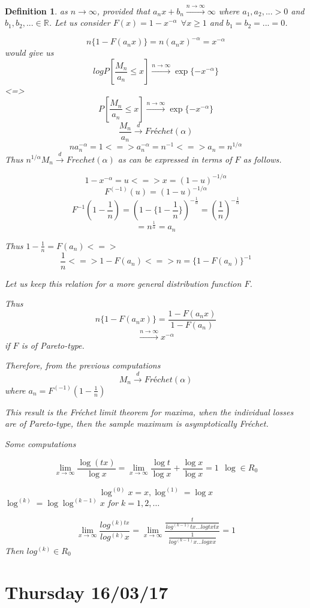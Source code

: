 \documentclass[11pt,a4paper,oneside]{article}\usepackage[]{graphicx}\usepackage[]{color}
\newenvironment{knitrout}{}{} %
\newtheorem{defi}[subsection]{Definition}
\begin{document}
\begin{algin*}
\begin{defi}
\begin{knitrout}
{}



\end{knitrout}

as $n\rightarrow \infty$, provided that $a_nx+b_n\xrightarrow{n\rightarrow\infty}\infty$ where
$a_1,a_2,...>0$ and $b_1,b_2,...\in\mathbb{R}$. Let us consider $F(x)=1-x^{-\alpha}\ \ \forall x \geq 1$ and $b_1=b_2=...=0$.

$$n\{1-F(a_nx)\}=n(a_nx)^{-\alpha}=x^{-\alpha}$$
would give us 
$$log P[\frac{M_n}{a_n}\leq x]\xrightarrow{n\rightarrow\infty}\exp\{-x^{-\alpha}\}$$
<=>
$$P[\frac{M_n}{a_n}\leq x]\xrightarrow{n\rightarrow\infty}\exp\{-x^{-\alpha}\}$$
$$\frac{M_n}{a_n}\xrightarrow{d} Fréchet(\alpha)$$
$$na_n^{-\alpha}=1<=>a_n^{-\alpha}=n^{-1}<=>a_n=n^{1/\alpha}$$
Thus $n^{1/\alpha}M_n\xrightarrow{d}Frechet(\alpha)$ as  can be expressed in terms of $F$ as follows.

$$1-x^{-\alpha}=u<=>x=(1-u)^{-1/\alpha}$$
$$F^{(-1)}(u)=(1-u)^{-1/\alpha}$$
$$F^{-1}(1-\frac{1}{n})=(1-\{1-\frac{1}{n}\})^{-\frac{1}{\alpha}}=(\frac{1}{n})^{-\frac{1}{\alpha}}$$
$$=n^{\frac{1}{\alpha}}=a_n$$

Thus $1-\frac{1}{n}=F(a_n)<=>$ $$\frac{1}{n}<=>1-F(a_n)<=>n=\{1-F(a_n)\}^{-1}$$

Let us keep this relation  for a more general distribution function $F$.

Thus
$$n\{1-F(a_nx)\}=\frac{1-F(a_nx)}{1-F(a_n)}$$
$$\xrightarrow{n\rightarrow\infty}x^{-\alpha}$$
if $F$ is of Pareto-type.

Therefore, from the previous computations
$$M_n\xrightarrow{d} Fréchet (\alpha)$$
where $a_n=F^{(-1)}(1-\frac{1}{n})$


This result is the Fréchet limit theorem for maxima, when the individual losses are of Pareto-type, then the sample  maximum is asymptotically Fréchet.

Some computations

$$\lim_{x\rightarrow\infty}\frac{\log(tx)}{\log x}=\lim_{x\rightarrow\infty}\frac{\log t}{\log x}+\frac{\log x}{\log x}=1\ \ \log \in R_0$$


$$\log^{(0)}x=x, \log^{(1)}=\log x$$
$\log^{(k)}=\log \log^{(k-1)}x$ for $k=1,2,\ldots$

$$\lim_{x\rightarrow\infty}\frac{log^{(k)tx}}{log^{(k)}x}
=\lim_{x\rightarrow\infty}\frac{\frac{t}{log^{(k-1)}tx...log tx tx}}{\frac{1}{log^{(k-1)}x...log x x}}=1$$
Then $log^{(k)}\in R_0$

\section{Thursday 16/03/17}

\end{defi}
\end{algin*}
\end{document}
